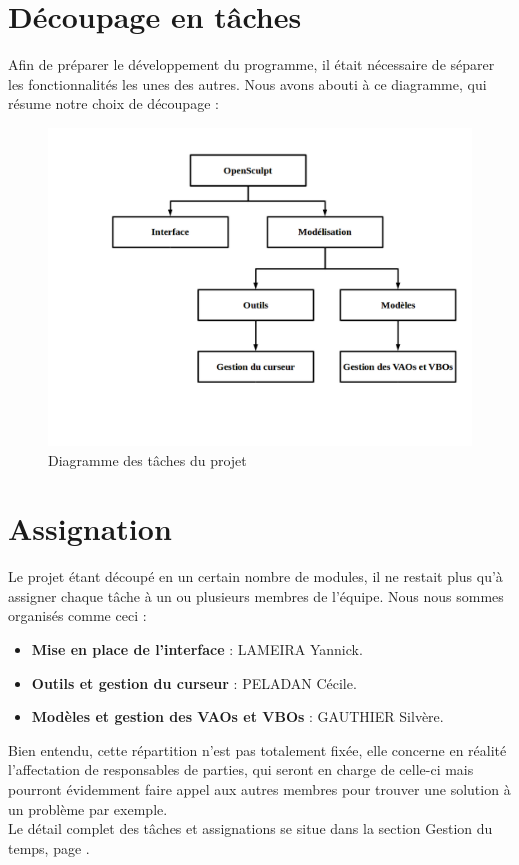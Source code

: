 \documentclass[a4paper]{memoir}
\begin{document}
		\section{Découpage en tâches}
			Afin de préparer le développement du programme, il était nécessaire de séparer les fonctionnalités les unes des autres. Nous avons abouti à ce diagramme, qui résume notre choix de découpage :\\
			\begin{figure}[H]
				\begin{center}
					\includegraphics[scale=0.5]{img/DiagrammeDecoupageProjet.png}
				\end{center}
				\label{fig:decoupage}
				\caption{Diagramme des tâches du projet}
			\end{figure}

		\section{Assignation}
			Le projet étant découpé en un certain nombre de modules, il ne restait plus qu'à assigner chaque tâche à un ou plusieurs membres de l'équipe. Nous nous sommes organisés comme ceci :
			\begin{itemize}[label=$\bullet$]
				\item \textbf{Mise en place de l'interface} : LAMEIRA Yannick.
				\item \textbf{Outils et gestion du curseur} : PELADAN Cécile.
				\item \textbf{Modèles et gestion des VAOs et VBOs} : GAUTHIER Silvère.
			\end{itemize}
			Bien entendu, cette répartition n'est pas totalement fixée, elle concerne en réalité l'affectation de responsables de parties, qui seront en charge de celle-ci mais pourront évidemment faire appel aux autres membres pour trouver une solution à un problème par exemple.\\
			Le détail complet des tâches et assignations se situe dans la section Gestion du temps, page \pageref{GestionTps}.
\end{document}
